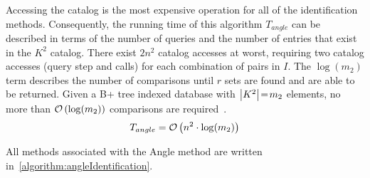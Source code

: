 
Accessing the catalog is the most expensive operation for all of the identification methods.
Consequently, the running time of this algorithm $T_{angle}$ can be described in terms of the number of queries and
the number of entries that exist in the $K^2$ catalog.
There exist $2n^2$ catalog accesses at worst, requiring two catalog accesses (query step and  calls) for
each combination of pairs in $I$.
The $\log (m_2)$ term describes the number of comparisons until $r$ sets are found and are able to be returned.
Given a B+ tree indexed database with $\left| K^2 \right| \!=\! m_2$ elements, no more than $\mathcal{O} \left( \log(m_2) \right)$
comparisons are required~\cite{patel:advanceTreeStructures}.
\begin{equation}\label{eq:complexityAngle}
    T_{angle} = \bigO\left( n^2 \cdot \log(m_2) \right)
\end{equation}

All methods associated with the Angle method are written in~\autoref{algorithm:angleIdentification}.

